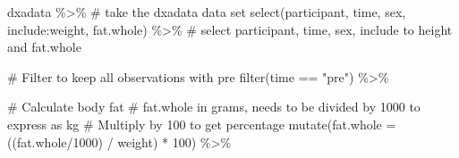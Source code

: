 \documentclass[
  11pt,
  letterpaper,
]{scrbook}
\newenvironment{Shaded}{\begin{snugshade}}{\end{snugshade}}
\newcommand{\AttributeTok}[1]{\textcolor[rgb]{0.40,0.45,0.13}{#1}}
\newcommand{\CommentTok}[1]{\textcolor[rgb]{0.37,0.37,0.37}{#1}}
\newcommand{\DecValTok}[1]{\textcolor[rgb]{0.68,0.00,0.00}{#1}}
\newcommand{\FunctionTok}[1]{\textcolor[rgb]{0.28,0.35,0.67}{#1}}
\newcommand{\NormalTok}[1]{\textcolor[rgb]{0.00,0.23,0.31}{#1}}
\newcommand{\SpecialCharTok}[1]{\textcolor[rgb]{0.37,0.37,0.37}{#1}}
\newcommand{\StringTok}[1]{\textcolor[rgb]{0.13,0.47,0.30}{#1}}
\begin{document}
\begin{Shaded}
\begin{Highlighting}[numbers=left,,]
\NormalTok{dxadata }\SpecialCharTok{\%\textgreater{}\%} \CommentTok{\# take the dxadata data set}
  \FunctionTok{select}\NormalTok{(participant, time, sex, include}\SpecialCharTok{:}\NormalTok{weight, fat.whole) }\SpecialCharTok{\%\textgreater{}\%} 
  \CommentTok{\# select participant, time, sex, include to height and fat.whole}
  
  \CommentTok{\# Filter to keep all observations with pre}
  \FunctionTok{filter}\NormalTok{(time }\SpecialCharTok{==} \StringTok{"pre"}\NormalTok{) }\SpecialCharTok{\%\textgreater{}\%}
  
  \CommentTok{\# Calculate body fat}
  \CommentTok{\# fat.whole in grams, needs to be divided by 1000 to express as kg}
  \CommentTok{\# Multiply by 100 to get percentage}
  \FunctionTok{mutate}\NormalTok{(}\AttributeTok{fat.whole =}\NormalTok{ ((fat.whole}\SpecialCharTok{/}\DecValTok{1000}\NormalTok{) }\SpecialCharTok{/}\NormalTok{ weight) }\SpecialCharTok{*} \DecValTok{100}\NormalTok{) }\SpecialCharTok{\%\textgreater{}\%}
  

\end{Highlighting}
\end{Shaded}
\end{document}
